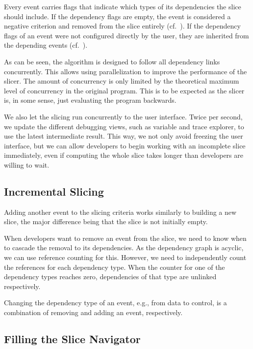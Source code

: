 \documentclass[
			english,
			]{elsarticle}
\begin{document}
Every event carries flags that indicate which types of its dependencies the slice should include.
If the dependency flags are empty, the event is considered a negative criterion and removed from the slice entirely (cf.~).
If the dependency flags of an event were not configured directly by the user, they are inherited from the depending events (cf.~).

As can be seen, the algorithm is designed to follow all dependency links concurrently.
This allows using parallelization to improve the performance of the slicer.
The amount of concurrency is only limited by the theoretical maximum level of concurrency in the original program.
This is to be expected as the slicer is, in some sense, just evaluating the program backwards.

We also let the slicing run concurrently to the user interface.
Twice per second, we update the different debugging views, such as variable and trace explorer, to use the latest intermediate result.
This way, we not only avoid freezing the user interface, but we can allow developers to begin working with an incomplete slice immediately, even if computing the whole slice takes longer than developers are willing to wait.

\subsection{Incremental Slicing}

Adding another event to the slicing criteria works similarly to building a new slice, the major difference being that the slice is not initially empty.

When developers want to remove an event from the slice, we need to know when to cascade the removal to its dependencies.
As the dependency graph is acyclic, we can use reference counting for this.
However, we need to independently count the references for each dependency type.
When the counter for one of the dependency types reaches zero, dependencies of that type are unlinked respectively.

Changing the dependency type of an event, e.g., from data to control, is a combination of removing and adding an event, respectively.

\subsection{Filling the Slice Navigator}
\end{document}

